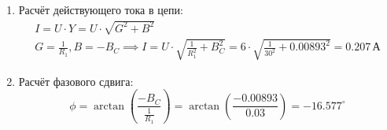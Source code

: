 \begin{enumerate}
	\item Расчёт действующего тока в цепи:
	      \[
		      \begin{gathered}
			      I = U \cdot Y = U \cdot \sqrt{G^2 + B^2} \\
			      G = \frac{1}{R_1}, B = -B_C \implies I = U \cdot \sqrt{\frac{1}{R_1^2} + B_C^2} = 6 \cdot \sqrt{\frac{1}{30^2} + 0.00893^2} = 0.207 \, \text{А}
		      \end{gathered}
	      \]
	\item Расчёт фазового сдвига:
	      \[
		      \phi = \arctan\left(\frac{-B_C}{\frac{1}{R_1}}\right) = \arctan\left(\frac{-0.00893}{0.03}\right) = -16.577^{\circ}
	      \]
\end{enumerate}
